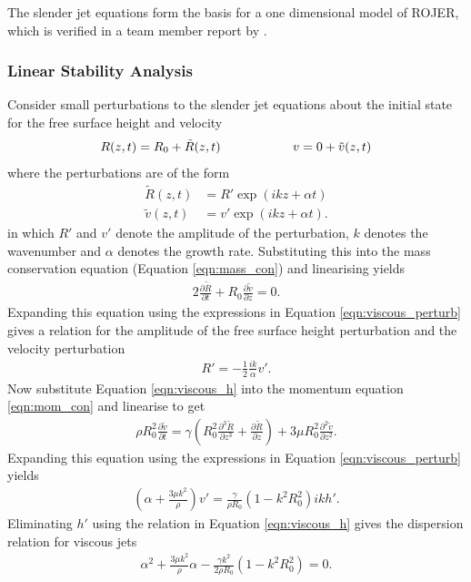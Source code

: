 \documentclass[11pt]{article}
\newcommand{\pd}[2]{\frac{\partial #1}{\partial #2}}
\newcommand{\pdtwo}[2]{\frac{\partial ^2 #1}{\partial #2 ^2}}
\newcommand{\pdthree}[2]{\frac{\partial ^3 #1}{\partial #2 ^3}}
\begin{document}
The slender jet equations form the basis for a one dimensional model of ROJER, 
which is verified in a team member report by \cite{hall2015report}.

\subsubsection{Linear Stability Analysis}
Consider small perturbations to the slender jet equations about the initial 
state for the free surface height and velocity
\begin{align*}
R(z,t) = R_0+ \tilde{R}(z,t) \hspace*{2cm} v = 0 + \tilde{v}(z,t)
\end{align*}
where the perturbations are of the form
\begin{align}
\tilde{R}(z,t) &= R' \exp(ikz + \alpha t) \nonumber \\
\tilde{v}(z,t) &= v' \exp(ikz + \alpha t).
\label{eqn:viscous_perturb}
\end{align}
in which $R'$ and $v'$ denote the amplitude of the perturbation, $k$ denotes 
the wavenumber and $\alpha$ denotes the growth rate. Substituting this into the 
mass conservation equation (Equation \ref{eqn:mass_con}) and linearising yields 
\begin{align}
2 \pd{\tilde{R}}{t} + R_0 \pd{\tilde{v}}{z} = 0.
\end{align}
Expanding this equation using the expressions in Equation \ref{eqn:viscous_perturb} 
gives a relation for the amplitude of the free surface height perturbation and 
the velocity perturbation
\begin{align}
R' = -\frac{1}{2} \frac{ik}{\alpha} v'.
\label{eqn:viscous_h}
\end{align}
Now substitute Equation \ref{eqn:viscous_h} into the momentum equation 
\ref{eqn:mom_con} and linearise to get
\begin{align*}
\rho R_0^2 \pd{\tilde{v}}{t} = \gamma \left( R_0^2 \pdthree{\tilde{R}}{z} + 
\pd{\tilde{R}}{z} \right) + 3 \mu R_0^2 \pdtwo{\tilde{v}}{z}.
\end{align*}
Expanding this equation using the expressions in Equation \ref{eqn:viscous_perturb} 
yields
\begin{align*}
\left(\alpha + \frac{3 \mu k^2}{\rho} \right) v' = \frac{\gamma}{\rho R_0}(1 - 
k^2 R_0^2) i k h'.
\end{align*}
Eliminating $h'$ using the relation in Equation \ref{eqn:viscous_h} gives the 
dispersion relation for viscous jets
\begin{align}
\alpha^2 + \frac{3 \mu k^2}{\rho}\alpha - \frac{\gamma k^2}{2 \rho R_0}(1 - 
k^2R_0^2) = 0.
\label{eqn:dispersion_viscous}
\end{align}
\end{document}
